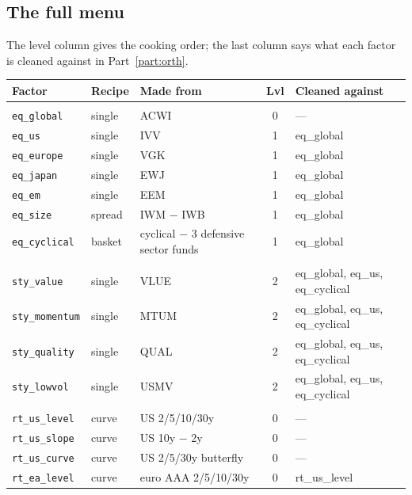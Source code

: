 \documentclass[11pt,a4paper]{article}
\newcommand{\fid}[1]{\texttt{#1}}
\begin{document}
\subsection{The full menu}\label{rec:menu}

The level column gives the cooking order; the last column says what each factor is
cleaned against in Part~\ref{part:orth}.

{\footnotesize
\begin{longtable}{@{}>{\ttfamily}l >{\raggedright\arraybackslash}p{1.9cm} >{\raggedright\arraybackslash}p{3.4cm} c >{\ttfamily\raggedright\arraybackslash}p{3.9cm}@{}}
\toprule
\textnormal{Factor} & Recipe & Made from & Lvl & \textnormal{Cleaned against} \\
\midrule
\endhead
\multicolumn{5}{@{}l}{\textit{Equity market}}\\
\fid{eq\_global} & single & ACWI & 0 & \textnormal{---} \\
\fid{eq\_us} & single & IVV & 1 & eq\_global \\
\fid{eq\_europe} & single & VGK & 1 & eq\_global \\
\fid{eq\_japan} & single & EWJ & 1 & eq\_global \\
\fid{eq\_em} & single & EEM & 1 & eq\_global \\
\fid{eq\_size} & spread & IWM $-$ IWB & 1 & eq\_global \\
\fid{eq\_cyclical} & basket & 5 cyclical $-$ 3 defensive sector funds & 1 & eq\_global \\
\multicolumn{5}{@{}l}{\textit{Equity style}}\\
\fid{sty\_value} & single & VLUE & 2 & eq\_global, eq\_us, eq\_cyclical \\
\fid{sty\_momentum} & single & MTUM & 2 & eq\_global, eq\_us, eq\_cyclical \\
\fid{sty\_quality} & single & QUAL & 2 & eq\_global, eq\_us, eq\_cyclical \\
\fid{sty\_lowvol} & single & USMV & 2 & eq\_global, eq\_us, eq\_cyclical \\
\multicolumn{5}{@{}l}{\textit{Rates}}\\
\fid{rt\_us\_level} & curve & US 2/5/10/30y & 0 & \textnormal{---} \\
\fid{rt\_us\_slope} & curve & US 10y $-$ 2y & 0 & \textnormal{---} \\
\fid{rt\_us\_curve} & curve & US 2/5/30y butterfly & 0 & \textnormal{---} \\
\fid{rt\_ea\_level} & curve & euro AAA 2/5/10/30y & 0 & rt\_us\_level \\

\end{longtable}}
\end{document}
